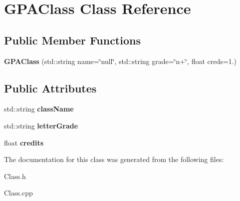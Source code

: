 \hypertarget{class_g_p_a_class}{}\section{G\+P\+A\+Class Class Reference}
\label{class_g_p_a_class}
\subsection*{Public Member Functions}
\begin{DoxyCompactItemize}
\item 
\mbox{\label{class_g_p_a_class_a272b5d464b8783ad606e29e3470c3233}} 
{\bfseries G\+P\+A\+Class} (std\+::string name=\char`\"{}null\char`\"{}, std\+::string grade=\char`\"{}n+\char`\"{}, float creds=1.)
\end{DoxyCompactItemize}
\subsection*{Public Attributes}
\begin{DoxyCompactItemize}
\item 
\mbox{\label{class_g_p_a_class_a99a5c4d9f018739a0f149a222ccbc320}} 
std\+::string {\bfseries class\+Name}
\item 
\mbox{\label{class_g_p_a_class_ac029cabe238b1bd3306b2d27c2523701}} 
std\+::string {\bfseries letter\+Grade}
\item 
\mbox{\label{class_g_p_a_class_a328d730be8bf5bbfc5367aa260f9b0f7}} 
float {\bfseries credits}
\end{DoxyCompactItemize}


The documentation for this class was generated from the following files\+:\begin{DoxyCompactItemize}
\item 
Class.\+h\item 
Class.\+cpp\end{DoxyCompactItemize}
